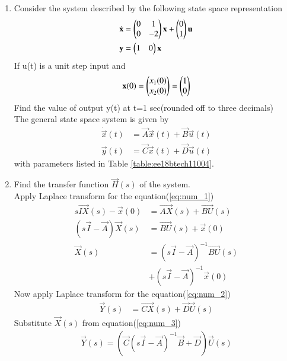 \begin{enumerate}[label=\thesubsection.\arabic*.,ref=\thesubsection.\theenumi]

\item
Consider the system described by the following state space representation  
\begin{align}
\dot{\mathbf{ x}}&=\begin{pmatrix}0&1\\0&-2\end{pmatrix}\mathbf{x} + \begin{pmatrix}0\\1\end{pmatrix}\mathbf{u}\\  
\mathbf{y} &= \begin{pmatrix}1&0\end{pmatrix}\mathbf{x}
\end{align}
If u(t) is a unit step input and 
\begin{align}
\mathbf{x}(0)=\begin{pmatrix}x_{1}(0)\\x_{2}(0)\end{pmatrix}=\begin{pmatrix}1\\0\end{pmatrix}
\end{align}
Find the value of output y(t) at t=1 sec(rounded off to three decimals)
\\
\solution The general state space system is given by
\begin{align}
\dot{\vec{x}}(t)&=\vec{A}\vec{x}(t)+\vec{B}\vec{u}(t) \label{eq:num_1}\\
 \vec{y}(t)&=\vec{C}\vec{x}(t)+\vec{D} \vec{u}(t) \label{eq:num_2}
\end{align}
with parameters listed in Table \ref{table:ee18btech11004}.
\begin{table}[!ht]
\centering

\caption{}
\label{table:ee18btech11004}
\end{table}
\item Find the transfer function $\vec{H}(s)$ of the system.
\\
\solution Apply Laplace transform for the equation(\ref{eq:num_1})
\begin{align}
 s\vec{IX}(s)-\vec{x}(0)&= \vec{AX}(s)+ \vec{BU}(s)\\
(s\vec{I}-\vec{A})\vec{X}(s)&= \vec{BU}(s)+ \vec{x}(0)\\
\vec{X}(s)&={(s\vec{I}-\vec{A})^{-1}}\vec{B U}(s)\\ &+(s\vec{I}-\vec{A})^{-1}\vec{x}(0) \label{eq:num_3}
\end{align}
Now apply Laplace transform for the equation(\ref{eq:num_2})
\begin{align}
    \vec{Y}(s)&= \vec{CX}(s)+\vec{D}\vec{U}(s)
\end{align}
Substitute $\vec{X}(s)$ from equation(\ref{eq:num_3})
\begin{multline}
\vec{Y}(s)=( \vec{C}{(s\vec{I}-\vec{A})^{-1}}\vec{B}+\vec{D}) \vec{U}(s) 

\end{multline}
\end{enumerate}
